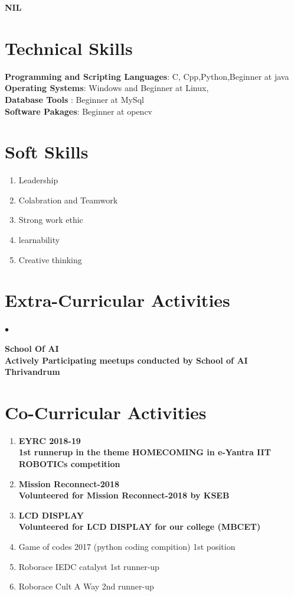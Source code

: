 \documentclass[margin,line]{res}
\newenvironment{list2}{
  \begin{list}{$\bullet$}{%
      \setlength{\itemsep}{0in}
      \setlength{\parsep}{0in} \setlength{\parskip}{0in}
      \setlength{\topsep}{0in} \setlength{\partopsep}{0in}
      \setlength{\leftmargin}{0.2in}}}{\end{list}}
\begin{document}
\begin{resume}
\bf NIL
\vspace{.1in}
\section{\sc Technical Skills}
{\bf Programming and Scripting Languages}:  C, Cpp,Python,Beginner at java \\
{\bf Operating Systems}: Windows and Beginner at Linux,\\
{\bf Database Tools}  :  Beginner at MySql\\
{\bf Software Pakages}:  Beginner at opencv\\

\section{\sc Soft Skills}
\begin{enumerate} %
	\item Leadership 
	\item Colabration and Teamwork
	\item Strong work ethic 
	\item learnability 
	\item Creative thinking
\end{enumerate}
\section{\sc Extra-Curricular Activities}
\begin{list2} %
	\item \bf School Of AI  \\
	Actively Participating meetups conducted by School of AI Thrivandrum
	
\end{list2}

\section{\sc Co-Curricular Activities}
\begin{enumerate} %
	\item \bf EYRC 2018-19 \\
	1st runnerup in the theme HOMECOMING in e-Yantra IIT ROBOTICs competition \\
	\item \bf Mission Reconnect-2018\\
	Volunteered for Mission Reconnect-2018 by KSEB \\
	\item \bf LCD DISPLAY   \\
	Volunteered for LCD DISPLAY for our college (MBCET) \\
	\item Game of codes 2017 (python coding compition) 1st position\\
	\item Roborace IEDC catalyst 1st runner-up\\
	\item Roborace Cult A Way 2nd runner-up \\
	

\end{enumerate}
\end{resume}
\end{document}
